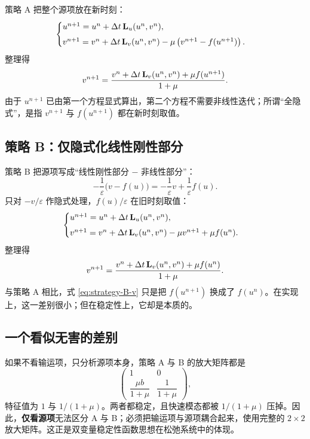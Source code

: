 策略 A 把整个源项放在新时刻：
\begin{equation}
  \begin{cases}
    u^{n+1}=u^n+\Delta t\,{\mathbf{L}}_u(u^n,v^n),\\[4pt]
    v^{n+1}=v^n+\Delta t\,{\mathbf{L}}_v(u^n,v^n)
    -\mu\left(v^{n+1}-f(u^{n+1})\right).
  \end{cases}
  \label{eq:strategy-A}
\end{equation}
整理得
\begin{equation}
  v^{n+1}=\frac{v^n+\Delta t\,{\mathbf{L}}_v(u^n,v^n)+\mu f(u^{n+1})}{1+\mu}.
  \label{eq:strategy-A-v}
\end{equation}
由于 $u^{n+1}$ 已由第一个方程显式算出，第二个方程不需要非线性迭代；所谓“全隐式”，是指 $v^{n+1}$ 与 $f(u^{n+1})$ 都在新时刻取值。

\subsection{策略 B：仅隐式化线性刚性部分}

策略 B 把源项写成“线性刚性部分 $-$ 非线性部分”：
\begin{equation}
  -\frac{1}{\varepsilon}\bigl(v-f(u)\bigr)
  =-\frac{1}{\varepsilon}v+\frac{1}{\varepsilon}f(u).
  \label{eq:source-split}
\end{equation}
只对 $-v/\varepsilon$ 作隐式处理，$f(u)/\varepsilon$ 在旧时刻取值：
\begin{equation}
  \begin{cases}
    u^{n+1}=u^n+\Delta t\,{\mathbf{L}}_u(u^n,v^n),\\[4pt]
    v^{n+1}=v^n+\Delta t\,{\mathbf{L}}_v(u^n,v^n)
    -\mu v^{n+1}+\mu f(u^n).
  \end{cases}
  \label{eq:strategy-B}
\end{equation}
整理得
\begin{equation}
  v^{n+1}=\frac{v^n+\Delta t\,{\mathbf{L}}_v(u^n,v^n)+\mu f(u^n)}{1+\mu}.
  \label{eq:strategy-B-v}
\end{equation}
与策略 A 相比，式 \eqref{eq:strategy-B-v} 只是把 $f(u^{n+1})$ 换成了 $f(u^n)$。在实现上，这一差别很小；但在稳定性上，它却是本质的。

\subsection{一个看似无害的差别}

如果不看输运项，只分析源项本身，策略 A 与 B 的放大矩阵都是
\begin{equation}
  \begin{pmatrix}1&0\\ \dfrac{\mu b}{1+\mu}&\dfrac{1}{1+\mu}\end{pmatrix},
  \label{eq:source-only}
\end{equation}
特征值为 $1$ 与 $1/(1+\mu)$。两者都稳定，且快速模态都被 $1/(1+\mu)$ 压掉。因此，\textbf{仅看源项}无法区分 A 与 B；必须把输运项与源项耦合起来，使用完整的 $2\times2$ 放大矩阵。这正是双变量稳定性函数思想在松弛系统中的体现。

